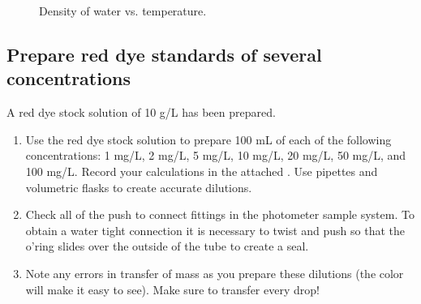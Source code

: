 \documentclass[letterpaper,10pt,english]{sphinxmanual}
\let\sphinxpxdimen\pdfpxdimen\else\newdimen\sphinxpxdimen
\begin{document}
\begin{figure}[htbp]
\centering
\capstart

\noindent\sphinxincludegraphics[width=300\sphinxpxdimen]{{Density_vs_T}.png}
\caption{Density of water vs. temperature.}\label{\detokenize{Laboratory_Measurements/Laboratory_Measurements:id5}}\label{\detokenize{Laboratory_Measurements/Laboratory_Measurements:figure-density-vs-t}}\end{figure}


\subsection{Prepare red dye standards of several concentrations}
\label{\detokenize{Laboratory_Measurements/Laboratory_Measurements:prepare-red-dye-standards-of-several-concentrations}}
A red dye stock solution of 10 g/L has been prepared.
\begin{enumerate}
\item {} 
Use the red dye stock solution to prepare 100 mL of each of the following concentrations: 1 mg/L, 2 mg/L, 5 mg/L, 10 mg/L, 20 mg/L, 50 mg/L, and 100 mg/L.  Record your calculations in the attached . Use pipettes and volumetric flasks to create accurate dilutions.

\item {} 
Check all of the push to connect fittings in the photometer sample system. To obtain a water tight connection it is necessary to twist and push so that the o’ring slides over the outside of the tube to create a seal.

\item {} 
Note any errors in transfer of mass as you prepare these dilutions (the color will make it easy to see). Make sure to transfer every drop!

\end{enumerate}
\end{document}
